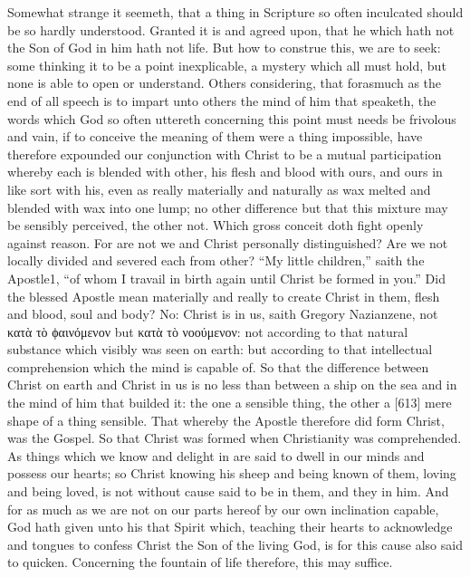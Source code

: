 Somewhat strange it seemeth, that a thing in Scripture so often inculcated should be so hardly understood. Granted it is and agreed upon, that he which hath not the Son of God in him hath not life. But how to construe this, we are to seek: some thinking it to be a point inexplicable, a mystery which all must hold, but none is able to open or understand. Others considering, that forasmuch as the end of all speech is to impart unto others the mind of him that speaketh, the words which God so often uttereth concerning this point must needs be frivolous and vain, if to conceive the meaning of them were a thing impossible, have therefore expounded our conjunction with Christ to be a mutual participation whereby each is blended with other, his flesh and blood with ours, and ours in like sort with his, even as really materially and naturally as wax melted and blended with wax into one lump; no other difference but that this mixture may be sensibly perceived, the other not. Which gross conceit doth fight openly against reason. For are not we and Christ personally distinguished? Are we not locally divided and severed each from other? “My little children,” saith the Apostle1, “of whom I travail in birth again until Christ be formed in you.” Did the blessed Apostle mean materially and really to create Christ in them, flesh and blood, soul and body? No: Christ is in us, saith Gregory Nazianzene, not κατὰ τὸ ϕαινόμενον but κατὰ τὸ νοούμενον: not according to that natural substance which visibly was seen on earth: but according to that intellectual comprehension which the mind is capable of. So that the difference between Christ on earth and Christ in us is no less than between a ship on the sea and in the mind of him that builded it: the one a sensible thing, the other a [613] mere shape of a thing sensible. That whereby the Apostle therefore did form Christ, was the Gospel. So that Christ was formed when Christianity was comprehended. As things which we know and delight in are said to dwell in our minds and possess our hearts; so Christ knowing his sheep and being known of them, loving and being loved, is not without cause said to be in them, and they in him. And for as much as we are not on our parts hereof by our own inclination capable, God hath given unto his that Spirit which, teaching their hearts to acknowledge and tongues to confess Christ the Son of the living God, is for this cause also said to quicken. Concerning the fountain of life therefore, this may suffice.

